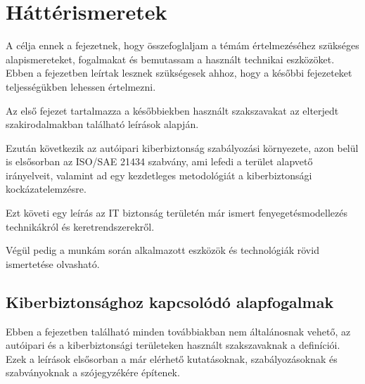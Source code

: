 \chapter{Háttérismeretek}

A célja ennek a fejezetnek, hogy összefoglaljam a témám értelmezéséhez szükséges alapismereteket, fogalmakat és bemutassam a használt technikai eszközöket. Ebben a fejezetben leírtak lesznek szükségesek ahhoz, hogy a későbbi fejezeteket teljességükben lehessen értelmezni.

Az első fejezet tartalmazza a későbbiekben használt szakszavakat az elterjedt szakirodalmakban található leírások alapján. 

Ezután következik az autóipari kiberbiztonság szabályozási környezete, azon belül is elsősorban az ISO/SAE 21434 szabvány, ami lefedi a terület alapvető irányelveit, valamint ad egy kezdetleges metodológiát a kiberbiztonsági kockázatelemzésre.

Ezt követi egy leírás az IT biztonság területén már ismert fenyegetésmodellezés technikákról és keretrendszerekről.

Végül pedig a munkám során alkalmazott eszközök és technológiák rövid ismertetése olvasható.

\section{Kiberbiztonsághoz kapcsolódó alapfogalmak}

Ebben a fejezetben található minden továbbiakban nem általánosnak vehető, az autóipari és a kiberbiztonsági területeken használt szakszavaknak a definíciói. Ezek a leírások elsősorban a már elérhető kutatásoknak, szabályozásoknak és szabványoknak a szójegyzékére építenek.

